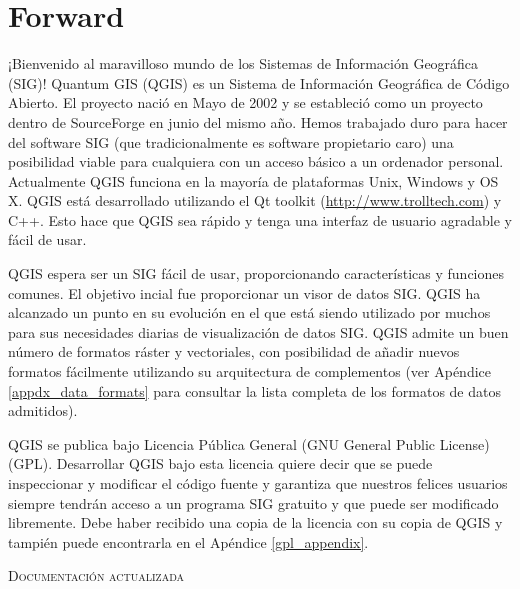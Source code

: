 
\section{Forward}\label{label_forward}
\setcounter{page}{1}


¡Bienvenido al maravilloso mundo de los Sistemas de Información Geográfica (SIG)!
Quantum GIS (QGIS) es un Sistema de Información Geográfica de Código Abierto. 
El proyecto nació en Mayo de 2002 y se estableció como un proyecto dentro de 
SourceForge en junio del mismo año. Hemos trabajado duro para hacer del 
software SIG (que tradicionalmente es software propietario caro) una posibilidad
viable para cualquiera con un acceso básico a un ordenador personal. 
Actualmente QGIS funciona en la mayoría de plataformas Unix, Windows y OS X. 
QGIS está desarrollado utilizando el Qt toolkit (\url{http://www.trolltech.com})
y C++. Esto hace que QGIS sea rápido y tenga una interfaz de usuario agradable
y fácil de usar.

QGIS espera ser un SIG fácil de usar, proporcionando características y 
funciones comunes. El objetivo incial fue proporcionar un visor de datos SIG. 
QGIS ha alcanzado un punto en su evolución en el que está siendo utilizado por muchos 
para sus necesidades diarias de visualización de datos SIG. QGIS admite un 
buen número de formatos ráster y vectoriales, con posibilidad de añadir nuevos formatos fácilmente
utilizando su arquitectura de complementos (ver Apéndice \ref{appdx_data_formats} 
para consultar la lista completa de los formatos de datos admitidos).

QGIS se publica bajo Licencia Pública General (GNU General Public License) (GPL). 
Desarrollar QGIS bajo esta licencia quiere decir que se puede inspeccionar y 
modificar el código fuente y garantiza que nuestros felices 
usuarios siempre tendrán acceso a un programa SIG gratuito y que puede ser 
modificado libremente. Debe haber recibido una copia de la licencia con su copia 
de QGIS y tampién puede encontrarla en el Apéndice \ref{gpl_appendix}.

\begin{Tip}\caption{\textsc{Documentación actualizada}}
\end{Tip}

